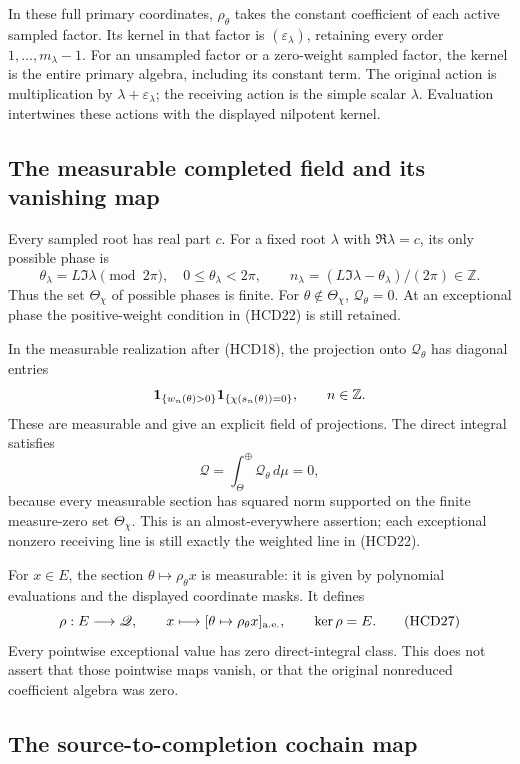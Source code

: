 \documentclass[11pt,a4paper]{article}
\theoremstyle{definition}
\begin{document}
In these full primary coordinates, $\rho_\theta$ takes
the constant coefficient of each active sampled factor.
Its kernel in that factor is $(\varepsilon_\lambda)$,
retaining every order $1,\ldots,m_\lambda-1$.
For an unsampled factor or a zero-weight sampled factor,
the kernel is the entire primary algebra, including
its constant term. The original action is multiplication
by $\lambda+\varepsilon_\lambda$; the receiving action
is the simple scalar $\lambda$. Evaluation intertwines
these actions with the displayed nilpotent kernel.

\subsection{The measurable completed field and its vanishing map}

Every sampled root has real part $c$. For a fixed root $\lambda$
with $\Re\lambda=c$, its only possible phase is
\[
 \theta_\lambda=L\Im\lambda\pmod{2\pi},\quad
 0\le\theta_\lambda<2\pi,\qquad
 n_\lambda=(L\Im\lambda-\theta_\lambda)/(2\pi)\in\mathbb Z.
\]
Thus the set $\Theta_\chi$ of possible phases is finite.
For $\theta\notin\Theta_\chi$, $\mathcal Q_\theta=0$.
At an exceptional phase the positive-weight condition
in (HCD22) is still retained.

In the measurable realization after (HCD18), the projection
onto $\mathcal Q_\theta$ has diagonal entries
\[
 {\bf1}_{\{w_n(\theta)>0\}}
 {\bf1}_{\{\chi(s_n(\theta))=0\}},\qquad n\in\mathbb Z.
\]
These are measurable and give an explicit field of projections.
The direct integral satisfies
\[
 \mathscr Q=\int_\Theta^\oplus\mathcal Q_\theta\,d\mu=0,
 \tag{HCD26}
\]
because every measurable section has squared norm supported
on the finite measure-zero set $\Theta_\chi$.
This is an almost-everywhere assertion; each exceptional
nonzero receiving line is still exactly the weighted line
in (HCD22).

For $x\in E$, the section $\theta\mapsto\rho_\theta x$
is measurable: it is given by polynomial evaluations and
the displayed coordinate masks. It defines
\[
 \rho:E\longrightarrow\mathscr Q,\qquad
 x\longmapsto[\theta\mapsto\rho_\theta x]_{\rm a.e.},
 \qquad \ker\rho=E.
 \tag{HCD27}
\]
Every pointwise exceptional value has zero direct-integral
class. This does not assert that those pointwise maps vanish,
or that the original nonreduced coefficient algebra was zero.

\subsection{The source-to-completion cochain map}
\end{document}
